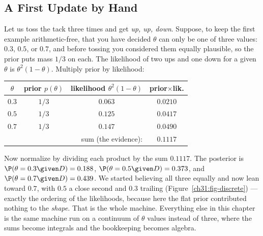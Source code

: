 \subsection{A First Update by Hand}

Let us toss the tack three times and get \emph{up, up, down}. Suppose, to keep the first
example arithmetic-free, that you have decided $\theta$ can only be one of three values:
$0.3$, $0.5$, or $0.7$, and before tossing you considered them equally plausible, so the
prior puts mass $1/3$ on each. The likelihood of two ups and one down for a given $\theta$
is $\theta^2(1-\theta)$. Multiply prior by likelihood:

\begin{center}
\begin{tabular}{cccc}
\toprule
$\theta$ & prior $p(\theta)$ & likelihood $\theta^2(1-\theta)$ & prior$\times$lik. \\
\midrule
$0.3$ & $1/3$ & $0.063$ & $0.0210$ \\
$0.5$ & $1/3$ & $0.125$ & $0.0417$ \\
$0.7$ & $1/3$ & $0.147$ & $0.0490$ \\
\midrule
\multicolumn{3}{r}{sum (the evidence):} & $0.1117$ \\
\bottomrule
\end{tabular}
\end{center}

Now normalize by dividing each product by the sum $0.1117$. The posterior is
$\P(\theta=0.3\given D) = 0.188$, $\P(\theta=0.5\given D)=0.373$, and
$\P(\theta=0.7\given D)=0.439$. We started believing all three equally and now lean toward
$0.7$, with $0.5$ a close second and $0.3$ trailing (Figure~\ref{ch31:fig-discrete}) ---
exactly the ordering of the
likelihoods, because here the flat prior contributed nothing to the \emph{shape}. That is
the whole machine. Everything else in this chapter is the same machine run on a continuum
of $\theta$ values instead of three, where the sums become integrals and the bookkeeping
becomes algebra.

